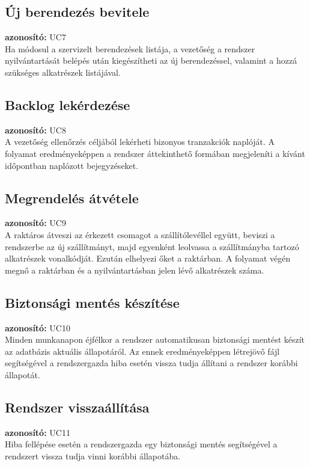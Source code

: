 \documentclass[12pt]{article}\usepackage[left=20mm,right=20mm,top=15mm,bottom=20mm]{geometry}
\begin{document}
\subsection{Új berendezés bevitele}
\textbf{azonosító: } UC7 \\
Ha módosul a szervizelt berendezések listája, a vezetőség a rendszer nyilvántartását belépés után kiegészítheti az új berendezéssel, valamint a hozzá szükséges alkatrészek listájával.

\subsection{Backlog lekérdezése}
\textbf{azonosító: } UC8 \\
A vezetőség ellenőrzés céljából lekérheti bizonyos tranzakciók naplóját. 
A folyamat eredményeképpen a rendszer áttekinthető formában megjeleníti a kívánt időpontban naplózott bejegyzéseket.

\subsection{Megrendelés átvétele}
\textbf{azonosító: } UC9 \\
A raktáros átveszi az érkezett csomagot a szállítólevéllel együtt, beviszi a rendszerbe az új szállítmányt, majd egyenként leolvassa a szállítmányba tartozó alkatrészek vonalkódját.
Ezután elhelyezi őket a raktárban.
A folyamat végén megnő a raktárban és a nyilvántartásban jelen lévő alkatrészek száma.

\subsection{Biztonsági mentés készítése}
\textbf{azonosító: } UC10 \\
Minden munkanapon éjfélkor a rendszer automatikusan biztonsági mentést készít az adatbázis aktuális állapotáról.
Az ennek eredményeképpen létrejövő fájl segítségével a rendszergazda hiba esetén vissza tudja állítani a rendszer korábbi állapotát.

\subsection{Rendszer visszaállítása}
\textbf{azonosító: } UC11 \\
Hiba fellépése esetén a rendszergazda egy biztonsági mentés segítségével a rendszert vissza tudja vinni korábbi állapotába.
\end{document}
